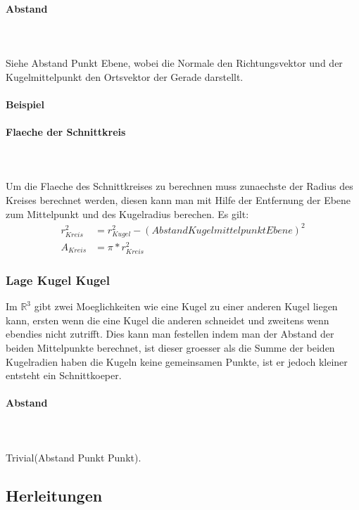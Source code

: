 \documentclass[a4paper]{article} %
\begin{document}
	\paragraph{Abstand}
	\hspace{0 cm} \\ \noindent \\
	Siehe Abstand Punkt Ebene, wobei die Normale den Richtungsvektor und der Kugelmittelpunkt den Ortsvektor der Gerade darstellt.
	\\\\\textbf{Beispiel}
	\paragraph{Flaeche der Schnittkreis}
	\hspace{0 cm} \\ \noindent \\
	Um die Flaeche des Schnittkreises zu berechnen muss zunaechste der Radius des Kreises berechnet werden,
	diesen kann man mit Hilfe der Entfernung der Ebene zum Mittelpunkt und des Kugelradius berechen.
	Es gilt:
	\begin{align*}
	r_{Kreis}^2 &=r_{Kugel}^2-(Abstand Kugelmittelpunkt Ebene)^2\\
	A_{Kreis} &= \pi*r_{Kreis}^2
	\end{align*}
	\subsubsection{Lage Kugel Kugel}
	Im $\mathbb{R}^3$ gibt zwei Moeglichkeiten wie eine Kugel zu einer anderen Kugel liegen kann, ersten wenn die eine Kugel die anderen schneidet und zweitens wenn ebendies nicht zutrifft. Dies kann man festellen indem man der Abstand der beiden Mittelpunkte berechnet, ist dieser groesser als die Summe der beiden Kugelradien haben die Kugeln keine gemeinsamen Punkte, ist er jedoch kleiner entsteht ein Schnittkoeper.
	\paragraph{Abstand}
	\hspace{0 cm} \\ \noindent \\
	Trivial(Abstand Punkt Punkt).
	\subsection{Herleitungen}
\end{document}
